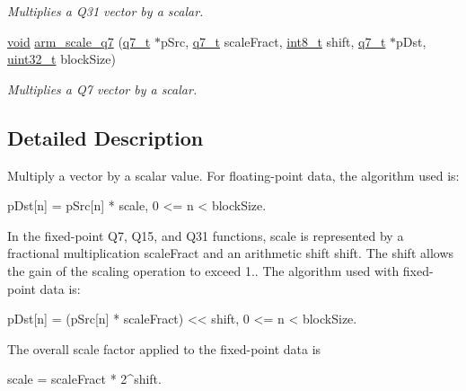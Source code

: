 \begin{DoxyCompactItemize}
\begin{DoxyCompactList}\small\item\em Multiplies a Q31 vector by a scalar. \end{DoxyCompactList}\item 
\hyperlink{group___n_a_m_e_ga18028b8badbf1ea7e704ccac3c488e82}{void} \hyperlink{group__scale_gabc9fd3d37904c58df56492b351d21fb0}{arm\-\_\-scale\-\_\-q7} (\hyperlink{arm__math_8h_ae541b6f232c305361e9b416fc9eed263}{q7\-\_\-t} $\ast$p\-Src, \hyperlink{arm__math_8h_ae541b6f232c305361e9b416fc9eed263}{q7\-\_\-t} scale\-Fract, \hyperlink{stdint_8h_ad566f6541e98b74246db1a3a3a85ad49}{int8\-\_\-t} shift, \hyperlink{arm__math_8h_ae541b6f232c305361e9b416fc9eed263}{q7\-\_\-t} $\ast$p\-Dst, \hyperlink{stdint_8h_a435d1572bf3f880d55459d9805097f62}{uint32\-\_\-t} block\-Size)
\begin{DoxyCompactList}\small\item\em Multiplies a Q7 vector by a scalar. \end{DoxyCompactList}\end{DoxyCompactItemize}


\subsection{Detailed Description}
Multiply a vector by a scalar value. For floating-\/point data, the algorithm used is\-:


\begin{DoxyPre}        
    pDst[n] = pSrc[n] * scale,   0 <= n < blockSize.        
\end{DoxyPre}


In the fixed-\/point Q7, Q15, and Q31 functions, {\ttfamily scale} is represented by a fractional multiplication {\ttfamily scale\-Fract} and an arithmetic shift {\ttfamily shift}. The shift allows the gain of the scaling operation to exceed 1.. The algorithm used with fixed-\/point data is\-:


\begin{DoxyPre}        
    pDst[n] = (pSrc[n] * scaleFract) << shift,   0 <= n < blockSize.        
\end{DoxyPre}


The overall scale factor applied to the fixed-\/point data is 
\begin{DoxyPre}        
    scale = scaleFract * 2^shift.        
\end{DoxyPre}
 

